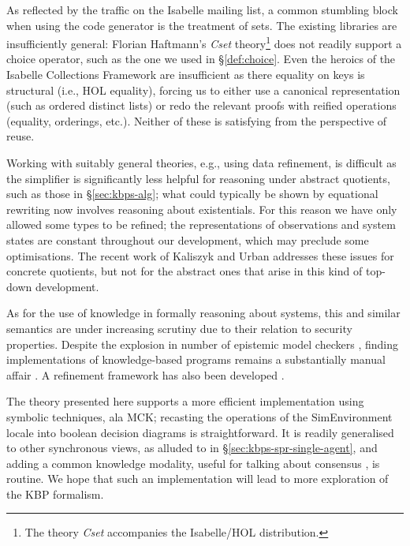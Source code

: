 \documentclass{article}
\newcommand{\isafun}[1]{{\sf #1}}
\begin{document}
As reflected by the traffic on the Isabelle mailing list, a common
stumbling block when using the code generator is the treatment of
sets. The existing libraries are insufficiently general: Florian
Haftmann's \emph{Cset} theory\footnote{The theory \emph{Cset}
  accompanies the Isabelle/HOL distribution.} does not readily support
a choice operator, such as the one we used in \S\ref{def:choice}. Even
the heroics of the Isabelle Collections Framework
\cite{DBLP:conf/itp/LammichL10} are insufficient as there equality on
keys is structural (i.e., HOL equality), forcing us to either use a
canonical representation (such as ordered distinct lists) or redo the
relevant proofs with reified operations (equality, orderings,
etc.). Neither of these is satisfying from the perspective of reuse.

Working with suitably general theories, e.g., using data refinement,
is difficult as the simplifier is significantly less helpful for
reasoning under abstract quotients, such as those in
\S\ref{sec:kbps-alg}; what could typically be shown by equational
rewriting now involves reasoning about existentials.  For this reason
we have only allowed some types to be refined; the representations of
observations and system states are constant throughout our
development, which may preclude some optimisations. The recent work of
Kaliszyk and Urban \cite{Quotients:2011} addresses these issues for
concrete quotients, but not for the abstract ones that arise in this
kind of top-down development.

As for the use of knowledge in formally reasoning about systems, this
and similar semantics are under increasing scrutiny due to their
relation to security properties. Despite the explosion in number of
epistemic model checkers
\cite{vanEijck:DEMO:2005,DBLP:conf/cav/GammieM04,DBLP:journals/fuin/KacprzakNNPPSWZ08,DBLP:conf/cav/LomuscioQR09},
finding implementations of knowledge-based programs remains a
substantially manual affair \cite{Ron:2010}. A refinement framework
has also been developed
\cite{DBLP:conf/lpar/BickfordCHP04,EvdMM2000:FOSSACS}.

The theory presented here supports a more efficient implementation
using symbolic techniques, ala MCK; recasting the operations of the
\isafun{SimEnvironment} locale into boolean decision diagrams is
straightforward. It is readily generalised to other synchronous views,
as alluded to in \S\ref{sec:kbps-spr-single-agent}, and adding a
common knowledge modality, useful for talking about consensus
\cite[Chapter~6]{FHMV:1995}, is routine. We hope that such an
implementation will lead to more exploration of the KBP formalism.
\end{document}

